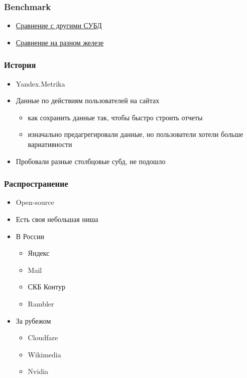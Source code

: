 \documentclass[xetex,mathserif,serif]{beamer}
\begin{document}
\begin{frame}
	\frametitle{Benchmark}

	\begin{itemize}
		\item \href{http://gg.gg/m73qs}{Сравнение с другими СУБД}
		\item \href{https://clickhouse.tech/benchmark/hardware/}{Сравнение на разном железе}
	\end{itemize}
\end{frame}


\begin{frame}
	\frametitle{История}

	\begin{itemize}
		\item Yandex.Metrika
		\item Данные по действиям пользователей на сайтах
		      \begin{itemize}
			      \item как сохранить данные так, чтобы быстро строить отчеты
			      \item изначально предагрегировали данные, но пользователи хотели больше вариативности
		      \end{itemize}
		\item Пробовали разные столбцовые субд, не подошло
	\end{itemize}
\end{frame}


\begin{frame}
	\frametitle{Распространение}

	\begin{itemize}
		\item Open-source
		\item Есть своя небольшая ниша
		\item В России
		      \begin{itemize}
			      \item Яндекс
			      \item Mail
			      \item СКБ Контур
			      \item Rambler
		      \end{itemize}
		\item За рубежом
		      \begin{itemize}
			      \item Cloudfare
			      \item Wikimedia
			      \item Nvidia
		      \end{itemize}
	\end{itemize}
\end{frame}
\end{document}
